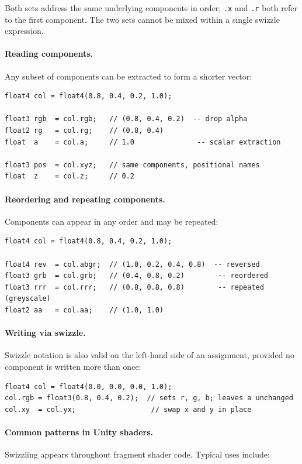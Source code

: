 \documentclass[11pt]{article}
\begin{document}
Both sets address the same underlying components in order; \texttt{.x} and \texttt{.r} both refer to the first component. The two sets cannot be mixed within a single swizzle expression.

\paragraph{Reading components.} Any subset of components can be extracted to form a shorter vector:

\begin{lstlisting}
float4 col = float4(0.8, 0.4, 0.2, 1.0);

float3 rgb  = col.rgb;   // (0.8, 0.4, 0.2)  -- drop alpha
float2 rg   = col.rg;    // (0.8, 0.4)
float  a    = col.a;     // 1.0               -- scalar extraction

float3 pos  = col.xyz;   // same components, positional names
float  z    = col.z;     // 0.2
\end{lstlisting}

\paragraph{Reordering and repeating components.} Components can appear in any order and may be repeated:

\begin{lstlisting}
float4 col = float4(0.8, 0.4, 0.2, 1.0);

float4 rev  = col.abgr;  // (1.0, 0.2, 0.4, 0.8)  -- reversed
float3 grb  = col.grb;   // (0.4, 0.8, 0.2)        -- reordered
float3 rrr  = col.rrr;   // (0.8, 0.8, 0.8)        -- repeated (greyscale)
float2 aa   = col.aa;    // (1.0, 1.0)
\end{lstlisting}

\paragraph{Writing via swizzle.} Swizzle notation is also valid on the left-hand side of an assignment, provided no component is written more than once:

\begin{lstlisting}
float4 col = float4(0.0, 0.0, 0.0, 1.0);
col.rgb = float3(0.8, 0.4, 0.2);  // sets r, g, b; leaves a unchanged
col.xy  = col.yx;                  // swap x and y in place
\end{lstlisting}

\paragraph{Common patterns in Unity shaders.} Swizzling appears throughout fragment shader code. Typical uses include:
\end{document}
